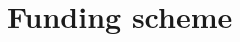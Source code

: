 \documentclass[english,12pt]{article}
\begin{document}

\newpage
\section{Funding scheme}
\end{document}
